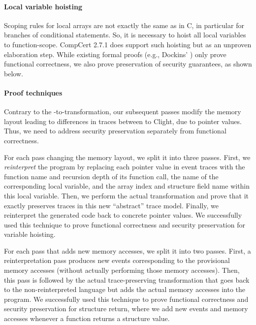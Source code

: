 \paragraph{Local variable hoisting}
Scoping rules for \cstar local arrays are not exactly the same as in
C, in particular for branches of conditional statements. So, it is
necessary to hoist all local variables to function-scope.  CompCert
2.7.1 does support such hoisting but as an unproven elaboration
step. While existing formal proofs (e.g., Dockins'
\cite[\S 9.3]{dockins-phd}) only prove functional
correctness, we also prove preservation of security guarantees, as
shown below.

\paragraph{Proof techniques}
Contrary to the \lamstar-to-\cstar transformation, our subsequent
passes modify the memory layout leading to differences in traces
between \cstar to Clight, due to pointer values. Thus, we need to
address security preservation separately from functional correctness.

   For each pass changing the memory layout, we split it into three
    passes. First, we \emph{reinterpret} the program by replacing each
    pointer value in event traces with the function name and recursion
    depth of its function call, the name of the corresponding local
    variable, and the array index and structure field name within this
    local variable. Then, we perform the actual transformation and
    prove that it exactly preserves traces in this new ``abstract''
    trace model. Finally, we reinterpret the generated code back to
    concrete pointer values.  We successfully used this technique to
    prove functional correctness and security preservation for
    variable hoisting.
    
  For each pass that adds new memory accesses, we split it into
    two passes. First, a reinterpretation pass produces new events
    corresponding to the provisional memory accesses (without actually
    performing those memory accesses). Then, this pass is followed by
    the actual trace-preserving transformation that goes back to the
    non-reinterpreted language but adds the actual memory accesses
    into the program.
    We successfully used this technique to prove functional
    correctness and security preservation for structure return, where
    we add new events and memory accesses whenever a \cstar function
    returns a structure value.

